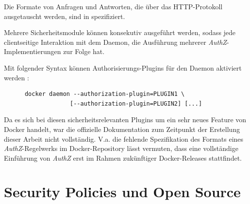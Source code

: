 \documentclass[../main.tex]{subfiles}
\begin{document}
    Die Formate von Anfragen und Antworten, die über das HTTP-Protokoll ausgetauscht werden, sind in \cite{githubAuthZExtended} spezifiziert.

    Mehrere Sicherheitsmodule können konsekutiv ausgeführt werden, sodass jede clientseitige Interaktion mit dem Daemon, die Ausführung mehrerer \emph{AuthZ}-Implementierungen zur Folge hat.

    Mit folgender Syntax können Authorisierungs-Plugins für den Daemon aktiviert werden \cite{githubAuthZExtended}:

    \begin{lstlisting}
      docker daemon --authorization-plugin=PLUGIN1 \
                   [--authorization-plugin=PLUGIN2] [...]
    \end{lstlisting}

    Da es sich bei diesen sicherheitsrelevanten Plugins um ein sehr neues Feature von Docker handelt, war die offizielle Dokumentation zum Zeitpunkt der Erstellung dieser Arbeit nicht vollständig. V.a. die fehlende Spezifikation des Formats eines \emph{AuthZ}-Regelwerks im Docker-Repository lässt vermuten, dass eine vollständige Einführung von \emph{AuthZ} erst im Rahmen zukünftiger Docker-Releases stattfindet.

  \section{Security Policies und Open Source}



\end{document}
